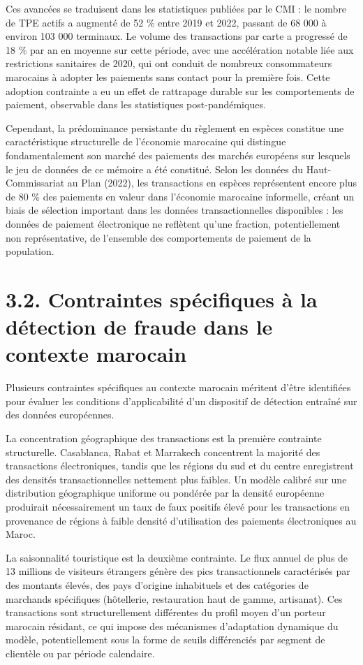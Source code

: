 Ces avancées se traduisent dans les statistiques publiées par le CMI : le nombre de TPE actifs a augmenté de 52 \% entre 2019 et 2022, passant de 68 000 à environ 103 000 terminaux. Le volume des transactions par carte a progressé de 18 \% par an en moyenne sur cette période, avec une accélération notable liée aux restrictions sanitaires de 2020, qui ont conduit de nombreux consommateurs marocains à adopter les paiements sans contact pour la première fois. Cette adoption contrainte a eu un effet de rattrapage durable sur les comportements de paiement, observable dans les statistiques post-pandémiques.

Cependant, la prédominance persistante du règlement en espèces constitue une caractéristique structurelle de l'économie marocaine qui distingue fondamentalement son marché des paiements des marchés européens sur lesquels le jeu de données de ce mémoire a été constitué. Selon les données du Haut-Commissariat au Plan (2022), les transactions en espèces représentent encore plus de 80 \% des paiements en valeur dans l'économie marocaine informelle, créant un biais de sélection important dans les données transactionnelles disponibles : les données de paiement électronique ne reflètent qu'une fraction, potentiellement non représentative, de l'ensemble des comportements de paiement de la population.

\section{3.2. Contraintes spécifiques à la détection de fraude dans le contexte marocain}

Plusieurs contraintes spécifiques au contexte marocain méritent d'être identifiées pour évaluer les conditions d'applicabilité d'un dispositif de détection entraîné sur des données européennes.

La concentration géographique des transactions est la première contrainte structurelle. Casablanca, Rabat et Marrakech concentrent la majorité des transactions électroniques, tandis que les régions du sud et du centre enregistrent des densités transactionnelles nettement plus faibles. Un modèle calibré sur une distribution géographique uniforme ou pondérée par la densité européenne produirait nécessairement un taux de faux positifs élevé pour les transactions en provenance de régions à faible densité d'utilisation des paiements électroniques au Maroc.

La saisonnalité touristique est la deuxième contrainte. Le flux annuel de plus de 13 millions de visiteurs étrangers génère des pics transactionnels caractérisés par des montants élevés, des pays d'origine inhabituels et des catégories de marchands spécifiques (hôtellerie, restauration haut de gamme, artisanat). Ces transactions sont structurellement différentes du profil moyen d'un porteur marocain résidant, ce qui impose des mécanismes d'adaptation dynamique du modèle, potentiellement sous la forme de seuils différenciés par segment de clientèle ou par période calendaire.

